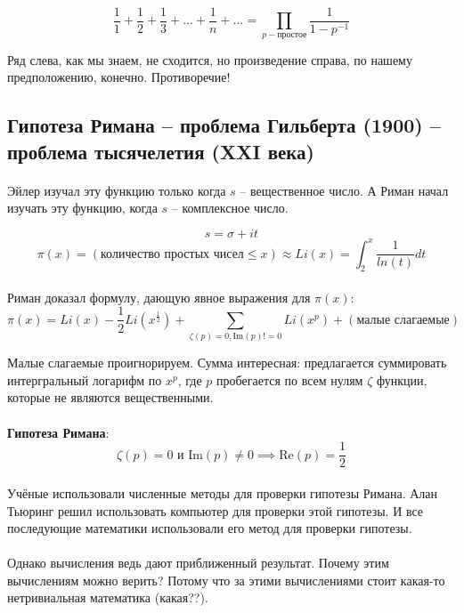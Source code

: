 \documentclass{article}
\begin{document}
$$
    \frac{1}{1} + \frac{1}{2} + \frac{1}{3}  + ... + \frac{1}{n} + ...
    = \prod_{p - \text{простое}} \frac{1}{1 - p^{-1}}
$$

Ряд слева, как мы знаем, не сходится, но произведение справа, по нашему предположению,
конечно. Противоречие!

\subsection{Гипотеза Римана -- проблема Гильберта (1900) -- проблема тысячелетия (XXI века)}

\paragraph{}
Эйлер изучал эту функцию только когда $s$ -- вещественное число.
А Риман начал изучать эту функцию, когда $s$ -- комплексное число.

$$ s = \sigma + it $$
$$ \pi(x) = (\text{количество простых чисел} \le x) \approx Li(x)
    = \int_{2}^{x} \frac{1}{ln(t)} dt
$$


\paragraph{}
Риман доказал формулу, дающую явное выражения для $\pi(x)$:
$$
    \pi(x) = Li(x) - \frac{1}{2} Li(x^\frac{1}{2}) + \sum_{{\zeta(p) = 0}, \text{Im}(p) != 0}
    Li(x^p) + (\text{малые слагаемые})
$$

Малые слагаемые проигнорируем. Сумма интересная: предлагается суммировать
интергральный логарифм по $x^p$, где $p$ пробегается по всем нулям $\zeta$ функции,
которые не являются вещественными. 

\paragraph{}
\textbf{Гипотеза Римана}:
$$
    \zeta(p) = 0 \text{ и } \text{Im}(p) \ne 0 \implies \text{Re}(p) = \frac{1}{2}
$$

\paragraph{}
Учёные использовали численные методы для проверки гипотезы Римана.
Алан Тьюринг решил использовать компьютер для проверки этой гипотезы.
И все последующие математики использовали его метод для проверки гипотезы.

\paragraph{}
Однако вычисления ведь дают приближенный результат. Почему этим вычислениям можно верить?
Потому что за этими вычислениями стоит какая-то нетривиальная математика (какая??).
\end{document}
